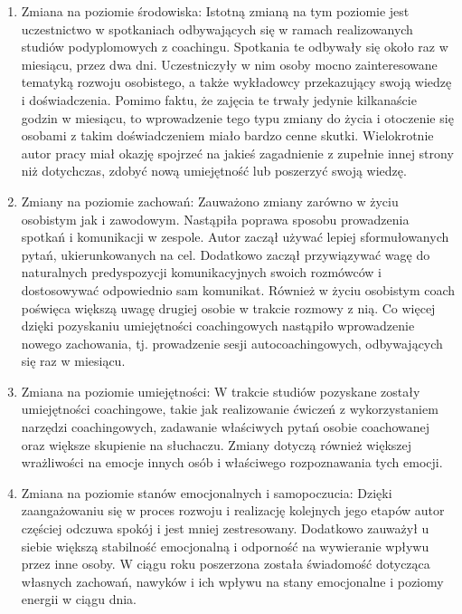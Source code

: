 \begin{enumerate}
  \item Zmiana na poziomie środowiska: Istotną zmianą na tym poziomie jest uczestnictwo w spotkaniach odbywających się
      w ramach realizowanych studiów podyplomowych z coachingu. Spotkania te odbywały się około raz w miesiącu, przez dwa dni.
      Uczestniczyły w nim osoby mocno zainteresowane tematyką rozwoju osobistego, a także wykładowcy przekazujący swoją
      wiedzę i doświadczenia. Pomimo faktu, że zajęcia te trwały jedynie kilkanaście godzin w miesiącu, to wprowadzenie
      tego typu zmiany do życia i otoczenie się osobami z takim doświadczeniem miało bardzo cenne skutki. Wielokrotnie
      autor pracy miał okazję spojrzeć na jakieś zagadnienie z zupełnie innej strony niż dotychczas, zdobyć nową umiejętność
      lub poszerzyć swoją wiedzę.

  \item Zmiany na poziomie zachowań: Zauważono zmiany zarówno w życiu osobistym jak i zawodowym. Nastąpiła poprawa sposobu
      prowadzenia spotkań i komunikacji w zespole. Autor zaczął używać lepiej sformułowanych pytań, ukierunkowanych na cel.
      Dodatkowo zaczął przywiązywać wagę do naturalnych predyspozycji komunikacyjnych swoich rozmówców i dostosowywać
      odpowiednio sam komunikat. Również w życiu osobistym coach poświęca większą uwagę drugiej osobie w trakcie rozmowy
      z nią. Co więcej dzięki pozyskaniu umiejętności coachingowych nastąpiło wprowadzenie nowego zachowania, tj. prowadzenie
      sesji autocoachingowych, odbywających się raz w miesiącu.

  \item Zmiana na poziomie umiejętności: W trakcie studiów pozyskane zostały umiejętności coachingowe, takie jak realizowanie
      ćwiczeń z wykorzystaniem narzędzi coachingowych, zadawanie właściwych pytań osobie coachowanej oraz większe skupienie na
      słuchaczu. Zmiany dotyczą również większej wrażliwości na emocje innych osób i właściwego rozpoznawania tych emocji.

  \item Zmiana na poziomie stanów emocjonalnych i samopoczucia: Dzięki zaangażowaniu się w proces rozwoju i realizację kolejnych
      jego etapów autor częściej odczuwa spokój i jest mniej zestresowany. Dodatkowo zauważył u siebie większą stabilność emocjonalną
      i odporność na wywieranie wpływu przez inne osoby. W ciągu roku poszerzona została świadomość dotycząca własnych zachowań, nawyków
      i ich wpływu na stany emocjonalne i poziomy energii w ciągu dnia.


\end{enumerate}
